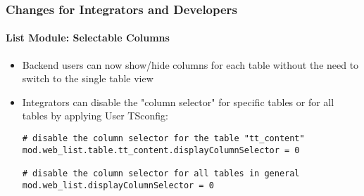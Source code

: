 %

\begin{frame}[fragile]
	\frametitle{Changes for Integrators and Developers}
	\framesubtitle{List Module: Selectable Columns}


	\begin{itemize}
		\item Backend users can now show/hide columns for each table without the
			need to switch to the single table view
		\item Integrators can disable the "column selector" for specific tables
			or for all tables by applying User TSconfig:
\begin{lstlisting}
# disable the column selector for the table "tt_content"
mod.web_list.table.tt_content.displayColumnSelector = 0

# disable the column selector for all tables in general
mod.web_list.displayColumnSelector = 0
\end{lstlisting}

	\end{itemize}

\end{frame}

